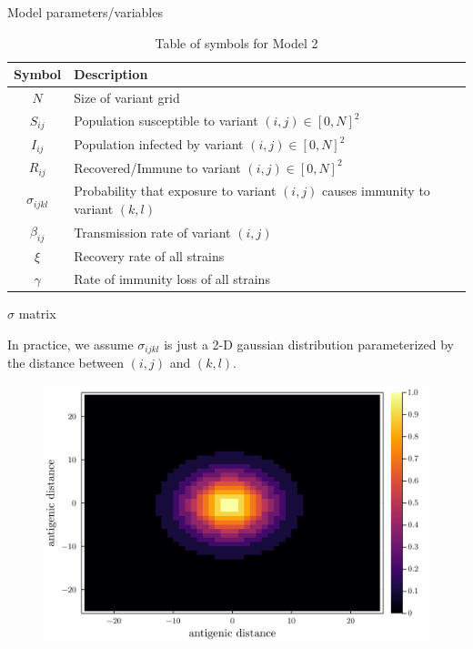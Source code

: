\documentclass{beamer}
\begin{document}
\begin{frame}{Model parameters/variables}
    \begin{table}[h!]
        \begin{center}
        \begin{tabular}{c|p{8cm}}
                Symbol & Description \\
                \hline
                \hline
                $N$ & Size of variant grid \\
                $S_{ij}$ & Population susceptible to variant $(i,j) \in [0,N]^2$ \\
                $I_{ij}$ & Population infected by variant $(i,j) \in [0,N]^2$\\
                $R_{ij}$ & Recovered/Immune to variant $(i,j) \in [0,N]^2$\\
                $\sigma_{ijkl}$ & Probability that exposure to variant $(i,j)$ causes immunity \newline to variant $(k,l)$\\
                $\beta_{ij}$ & Transmission rate of variant $(i,j)$\\
                $\xi$ & Recovery rate of all strains \\
                $\gamma$ & Rate of immunity loss of all strains \\
        \end{tabular}
        \caption{Table of symbols for Model 2}
    
        \label{variables_2}
        \end{center}
    \end{table}
\end{frame}
\begin{frame}{$\sigma$ matrix}
    
    In practice, we assume $\sigma_{ijkl}$ is just a 2-D gaussian distribution parameterized by the distance between $(i,j)$ and $(k,l)$.
    \begin{figure}
        \includegraphics[width=\textwidth]{../SarsEvoModel/plots/sigma.png}
    \end{figure}

\end{frame}
\end{document}
